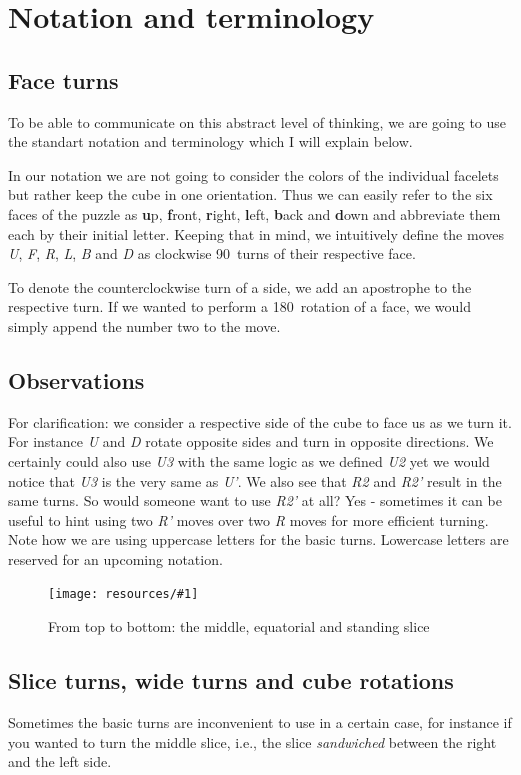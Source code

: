 \documentclass[a4paper]{scrreprt}
\newcommand{\img}[3]{
	\begin{figure}[ht]
	\centering
  \texttt{[image: resources/\#1]}
	\caption{#3}
	\end{figure}
}
\begin{document}
\section{Notation and terminology}
\subsection{Face turns}
To be able to communicate on this abstract level of thinking, we are going to use the standart notation and terminology which I will explain below.\par
In our notation we are not going to consider the colors of the individual facelets but rather keep the cube in one orientation. Thus we can easily refer to the six faces of the puzzle as \textbf{u}p, \textbf{f}ront, \textbf{r}ight, \textbf{l}eft, \textbf{b}ack and \textbf{d}own and abbreviate them each by their initial letter. Keeping that in mind, we intuitively define the moves \emph{U}, \emph{F}, \emph{R}, \emph{L}, \emph{B} and \emph{D} as clockwise 90\textdegree\ turns of their respective face.\par
To denote the counterclockwise turn of a side, we add an apostrophe to the respective turn. If we wanted to perform a 180\textdegree\ rotation of a face, we would simply append the number two to the move.


\subsection{Observations}
For clarification: we consider a respective side of the cube to face us as we turn it. For instance \emph{U} and \emph{D} rotate opposite sides and turn in opposite directions. We certainly could also use \emph{U3} with the same logic as we defined \emph{U2} yet we would notice that \emph{U3} is the very same as \emph{U'}. We also see that \emph{R2} and \emph{R2'} result in the same turns. So would someone want to use \emph{R2'} at all? Yes - sometimes it can be useful to hint using two \emph{R'} moves over two \emph{R} moves for more efficient turning. Note how we are using uppercase letters for the basic turns. Lowercase letters are reserved for an upcoming notation.

\img{slices.png}{0.4}{From top to bottom: the middle, equatorial and standing slice}

\subsection{Slice turns, wide turns and cube rotations}
Sometimes the basic turns are inconvenient to use in a certain case, for instance if you wanted to turn the middle slice, i.e., the slice \emph{sandwiched} between the right and the left side.\par
\end{document}

